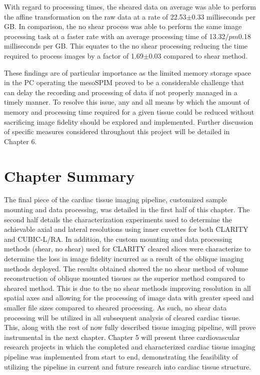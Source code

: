 With regard to processing times, the sheared data on average was able to perform the affine transformation on the raw data at a rate of 22.53$\pm$0.33 milliseconds per GB. In comparison, the no shear process was able to perform the same image processing task at a faster rate with an average processing time of 13.32$/pm$0.18 milliseconds per GB. This equates to the no shear processing reducing the time required to process images by a factor of 1.69$\pm$0.03 compared to shear method.

These findings are of particular importance as the limited memory storage space in the PC operating the mesoSPIM proved to be a considerable challenge that can delay the recording and processing of data if not properly managed in a timely manner. To resolve this issue, any and all means by which the amount of memory and processing time required for a given tissue could be reduced without sacrificing image fidelity should be explored and implemented. Further discussion of specific measures considered throughout this project will be detailed in Chapter 6.

\section{Chapter Summary}

The final piece of the cardiac tissue imaging pipeline, customized sample mounting and data processing, was detailed in the first half of this chapter. The second half details the characterization experiments used to determine the achievable axial and lateral resolutions using inner cuvettes for both CLARITY and CUBIC-L/RA. In addition, the custom mounting and data processing methods (shear, no shear) used for CLARITY cleared slices were characterize to determine the loss in image fidelity incurred as a result of the oblique imaging methods deployed. The results obtained showed the no shear method of volume reconstruction of oblique mounted tissues as the superior method compared to sheared method. This is due to the no shear methods improving resolution in all spatial axes and allowing for the processing of image data with greater speed and smaller file sizes compared to sheared processing. As such, no shear data processing will be utilized in all subsequent analysis of cleared cardiac tissue. This, along with the rest of now fully described tissue imaging pipeline, will prove instrumental in the next chapter. Chapter 5 will present three cardiovascular research projects in which the completed and characterized cardiac tissue imaging pipeline was implemented from start to end, demonstrating the feasibility of utilizing the pipeline in current and future research into cardiac tissue structure.